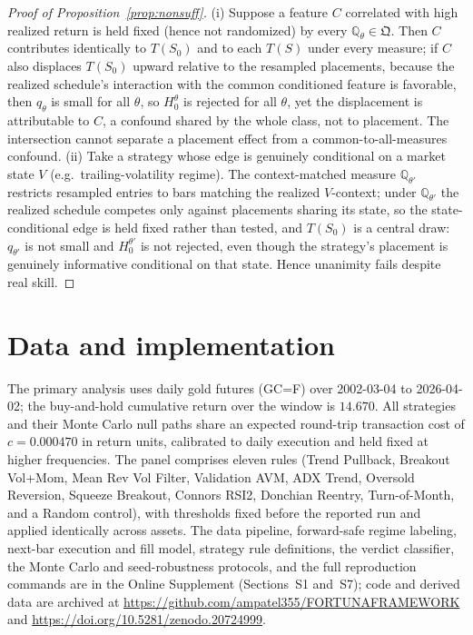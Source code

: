 \documentclass[risks,article,submit,pdftex,oneauthor]{Definitions/mdpi}
\begin{document}
\begin{proof}[Proof of Proposition~\ref{prop:nonsuff}]
(i) Suppose a feature $C$ correlated with high realized return is held fixed
(hence not randomized) by every $\mathbb{Q}_\theta\in\mathfrak Q$. Then $C$
contributes identically to $T(S_0)$ and to each $T(S)$ under every measure; if $C$
also displaces $T(S_0)$ upward relative to the resampled placements, because the
realized schedule's interaction with the common conditioned feature is
favorable, then $q_\theta$ is small for all $\theta$, so $H_0^\theta$ is rejected
for all $\theta$, yet the displacement is attributable to $C$, a confound shared
by the whole class, not to placement. The intersection cannot separate a
placement effect from a common-to-all-measures confound. (ii) Take a strategy
whose edge is genuinely conditional on a market state $V$ (e.g.\
trailing-volatility regime). The context-matched measure $\mathbb{Q}_{\theta'}$
restricts resampled entries to bars matching the realized $V$-context; under
$\mathbb{Q}_{\theta'}$ the realized schedule competes only against placements
sharing its state, so the state-conditional edge is held fixed rather than tested,
and $T(S_0)$ is a central draw: $q_{\theta'}$ is not small and $H_0^{\theta'}$ is
not rejected, even though the strategy's placement is genuinely informative
conditional on that state. Hence unanimity fails despite real skill.
\end{proof}

\section{Data and implementation}
\label{app:data}

The primary analysis uses daily gold futures (GC=F) over 2002-03-04 to 2026-04-02;
the buy-and-hold cumulative return over the window is $14.670$. All strategies and
their Monte Carlo null paths share an expected round-trip transaction cost of
$c=0.000470$ in return units, calibrated to daily execution and held fixed at higher
frequencies. The panel comprises eleven rules (Trend Pullback, Breakout Vol+Mom,
Mean Rev Vol Filter, Validation AVM, ADX Trend, Oversold Reversion, Squeeze
Breakout, Connors RSI2, Donchian Reentry, Turn-of-Month, and a Random control), with
thresholds fixed before the reported run and applied identically across assets. The
data pipeline, forward-safe regime labeling, next-bar execution and fill model,
strategy rule definitions, the verdict classifier, the Monte Carlo and seed-robustness
protocols, and the full reproduction commands are in the Online Supplement
(Sections~S1 and~S7); code and derived data are archived at
\url{https://github.com/ampatel355/FORTUNAFRAMEWORK} and \url{https://doi.org/10.5281/zenodo.20724999}.



\end{document}
